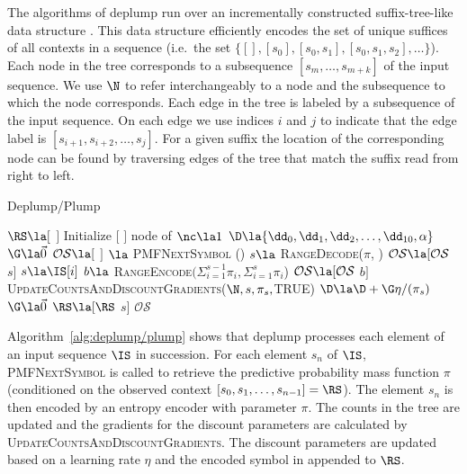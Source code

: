 The algorithms of deplump run over an incrementally constructed suffix-tree-like data structure \citep{Ukkonen1992}. This data structure efficiently encodes the set of unique suffices of all contexts in a sequence (i.e.~the set $\{ [ ], [s_0], [s_0,s_1], [s_0, s_1,s_2], \ldots \}$).  Each node in the tree corresponds to a subsequence $[s_m, \ldots, s_{m + k}]$ of the input sequence.  We use $\N$ to refer interchangeably to a node and the subsequence to which the node corresponds.  Each edge in the tree is labeled by a subsequence of the input sequence.  On each edge we use indices $i$ and $j$ to indicate that the edge label is $[s_{i+1}, s_{i+2}, \ldots,s_{j}]$. For a given suffix the location of the corresponding node can be found by traversing edges of the tree that match the suffix read from right to left. 

\begin{algorithm}[t]
    \caption{Deplump/Plump} \label{alg:deplump/plump}
    \begin{algorithmic}[1]
		\State $\RS \la [$ $]  $ 
		\State Initialize $[$ $]$ node of \T {}
		\State $\nc \la 1$ 
		\State $\D \la  \{ \dd_0, \dd_1, \dd_2, \dots, \dd_{10}, \alpha \}$ 
		\State $\G \la \vec 0$ 
		\State $\mathcal{O}\mathcal{S} \la  [$ $]$ 
			\State [$\pi$, \N] $\la$ \textsc{PMFNextSymbol} (\RS)
				\State $s \la $ \textsc{RangeDecode}($\pi$, \IS)
				\State $\mathcal{O}\mathcal{S} \la [\mathcal{O}\mathcal{S}$ $s]$
			\Else
				\State $s \la \IS[i]$
				\State $b \la$ \textsc{RangeEncode}$(\Sigma_{i = 1}^{s-1} \pi_i, \Sigma_{i = 1}^{s} \pi_i$)
				\State $\mathcal{O}\mathcal{S} \la [\mathcal{O}\mathcal{S}$ $b]$		
			\EndIf
			\State \textsc{UpdateCountsAndDiscountGradients}($\N,s,\pi_s,$TRUE)
			\State $\D \la \D + \G \eta / (\pi_s)$ 
			\State $\G \la \vec 0$ 
			\State $\RS \la [\RS$ $s]$ 
		\EndFor
		\State \Return $\mathcal{O}\mathcal{S}$
	\EndProcedure
	\end{algorithmic}
\end{algorithm}

Algorithm~\ref{alg:deplump/plump} shows that deplump processes each element of an input sequence $\IS$ in succession.  For each element $s_n$ of $\IS$, \textsc{PMFNextSymbol} is called to retrieve the predictive probability mass function $\pi$ (conditioned on the observed context $[s_0, s_1, \ldots, s_{n-1}] = \RS$).  The element $s_n$ is then encoded by an entropy encoder with parameter $\pi$.  The counts in the tree are updated and the gradients for the discount parameters are calculated by \textsc{UpdateCountsAndDiscountGradients}. The discount parameters are updated based on a learning rate $\eta$ and the encoded symbol in appended to $\RS$.

